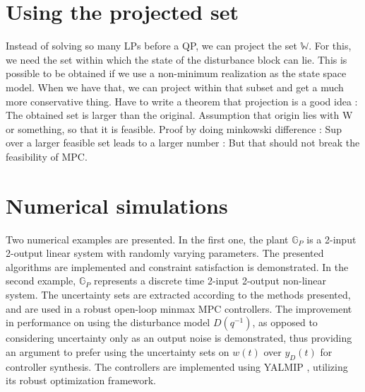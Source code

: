 \documentclass[letterpaper, 10 pt, conference]{ieeeconf}  %
\begin{document}
\section{Using the projected set}
Instead of solving so many LPs before a QP, we can project the set $\mathbb{W}$. For this, we need the set within which the state of the disturbance block can lie. This is possible to be obtained if we use a non-minimum realization as the state space model. When we have that, we can project within that subset and get a much more conservative thing. 
Have to write a theorem that projection is a good idea : The obtained set is larger than the original. Assumption that origin lies with W or something, so that it is feasible. Proof by doing minkowski difference : Sup over a larger feasible set leads to a larger number : But that should not break the feasibility of MPC.
    
    \fi
\section{Numerical simulations}
Two numerical examples are presented. In the first one, the plant $\mathbb{G}_P$ is a 2-input 2-output linear system with randomly varying parameters. The presented algorithms are implemented and constraint satisfaction is demonstrated.  In the second example, $\mathbb{G}_P$ represents a discrete time 2-input 2-output non-linear system. The uncertainty sets are extracted according to the methods presented, and are used in a robust open-loop minmax MPC controllers. The improvement in performance on using the disturbance model $D(q^{-1})$, as opposed to considering uncertainty only as an output noise is demonstrated, thus providing an argument to prefer using the uncertainty sets on $w(t)$ over $y_D(t)$ for controller synthesis. The controllers are implemented using YALMIP \cite{Lofberg2004}, utilizing its robust optimization framework.
\end{document}
